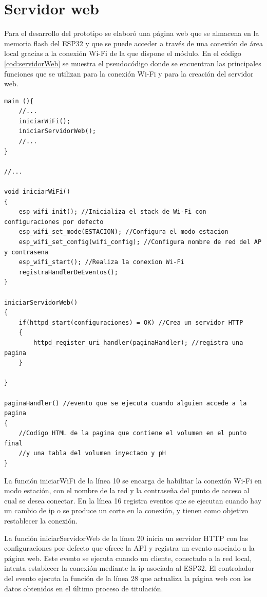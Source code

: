 \section{Servidor web}

Para el desarrollo del prototipo se elaboró una página web que se almacena en la memoria flash del ESP32 y que se puede acceder a través de una conexión de área local gracias a la conexión Wi-Fi de la que dispone el módulo. En el código \ref{cod:servidorWeb} se muestra el pseudocódigo donde se encuentran las principales funciones que se utilizan para la conexión Wi-Fi y para la creación del servidor web.

\begin{lstlisting}[label=cod:servidorWeb,caption=Pseudocódigo del servidor web.]
main (){
	//...
	iniciarWiFi();
	iniciarServidorWeb();
	//...
}

//...

void iniciarWiFi()
{
	esp_wifi_init(); //Inicializa el stack de Wi-Fi con configuraciones por defecto
	esp_wifi_set_mode(ESTACION); //Configura el modo estacion
	esp_wifi_set_config(wifi_config); //Configura nombre de red del AP y contrasena
	esp_wifi_start(); //Realiza la conexion Wi-Fi
	registraHandlerDeEventos();
}

iniciarServidorWeb()
{
	if(httpd_start(configuraciones) = OK) //Crea un servidor HTTP
	{
		httpd_register_uri_handler(paginaHandler); //registra una pagina
	}
	
}

paginaHandler() //evento que se ejecuta cuando alguien accede a la pagina
{
	//Codigo HTML de la pagina que contiene el volumen en el punto final
	//y una tabla del volumen inyectado y pH
}

\end{lstlisting}

La función iniciarWiFi de la línea 10 se encarga de habilitar la conexión Wi-Fi en modo estación, con el nombre de la red y la contraseña del punto de acceso al cual se desea conectar. En la línea 16 registra eventos que se ejecutan cuando hay un cambio de ip o se produce un corte en la conexión, y tienen como objetivo restablecer la conexión.

La función iniciarServidorWeb de la línea 20 inicia un servidor HTTP con las configuraciones por defecto que ofrece la API y registra un evento asociado a la página web. Este evento se ejecuta cuando un cliente, conectado a la red local, intenta establecer la conexión mediante la ip asociada al ESP32. El controlador del evento ejecuta la función  de la línea 28 que actualiza la página web con los datos obtenidos en el último proceso de titulación.

